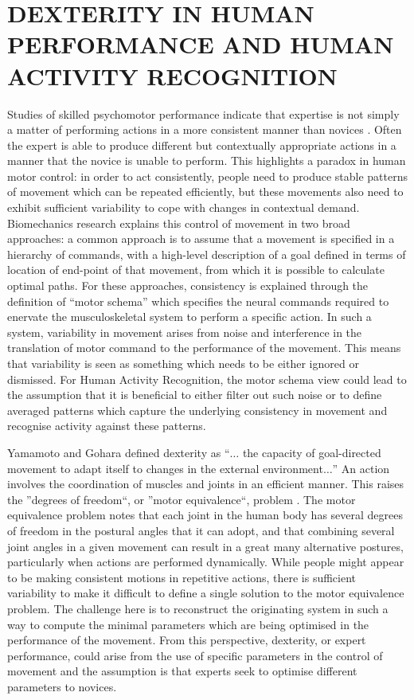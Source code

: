 \documentclass{sigchi}
\begin{document}
\section{DEXTERITY IN HUMAN PERFORMANCE AND HUMAN ACTIVITY RECOGNITION}
Studies of skilled psychomotor performance indicate that expertise is not simply a matter of performing actions 
in a more consistent manner than novices \cite{Kelso2014}. Often the expert is able to produce different but 
contextually appropriate actions in a manner that the novice is unable to perform. This highlights a paradox 
in human motor control: in order to act consistently, people need to produce stable patterns of movement 
which can be repeated efficiently, but these movements also need to exhibit sufficient variability to cope 
with changes in contextual demand. 
Biomechanics research explains this control of movement in two broad approaches: 
a common approach is to assume that a movement is specified in a hierarchy of commands, 
with a high-level description of a goal defined in terms of location of end-point of that movement, 
from which it is possible to calculate optimal paths. 
For these approaches, consistency is 
explained through the definition of ``motor schema'' which specifies the neural commands required to enervate 
the musculoskeletal system to perform a specific action. In such a system, variability in movement arises 
from noise and interference in the translation of motor command to the performance of the movement. 
This means that variability is seen as something which needs to be either ignored or dismissed. 
For Human Activity Recognition, the motor schema view could lead to the assumption that it is beneficial 
to either filter out such noise or to define averaged patterns which capture the underlying consistency 
in movement and recognise activity against these patterns. 

Yamamoto and Gohara \cite{Yamamoto2000} defined dexterity as ``$\ldots$ the capacity of goal-directed movement 
to adapt itself to changes in the external environment$\ldots$''  An action involves the coordination of muscles and 
joints in an efficient manner. This raises the ''degrees of freedom``, or ''motor equivalence``, 
problem \cite{Bernstein1967}. 
The motor equivalence problem notes that each joint in the human body has several degrees of freedom in 
the postural angles that it can adopt, and that combining several joint angles in a given movement can 
result in a great many alternative postures, particularly when actions are performed dynamically. 
While people might appear to be making consistent motions in repetitive actions, there is sufficient 
variability to make it difficult to define a single solution to the motor equivalence problem. 
The challenge here is to reconstruct the originating system in such a way to 
compute the minimal parameters which are being optimised in the performance of the movement. 
From this perspective, dexterity, 
or expert performance, could arise from the use of specific parameters in the control of movement and 
the assumption is that experts seek to optimise different parameters to novices. 
 
\end{document}
